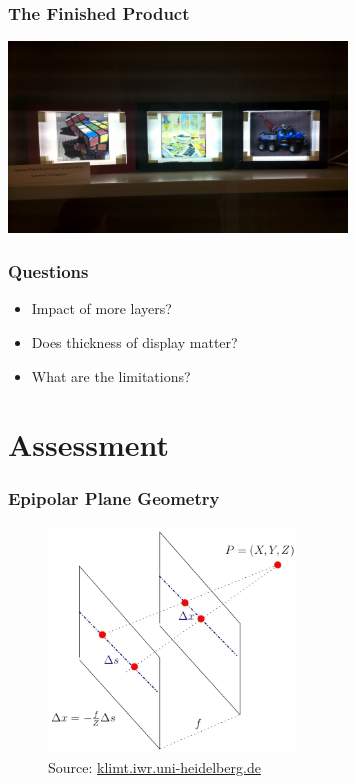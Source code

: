 \documentclass[12pt, compress]{beamer}
\begin{document}
\begin{frame}[fragile]
	\frametitle{The Finished Product}
	\begin{center}
		\includegraphics[width=9cm]{images/all_displays_on}
	\end{center}
\end{frame}

\begin{frame}[fragile]
	\frametitle{Questions}
	
	\begin{itemize}
		\item Impact of more layers?
		\item Does thickness of display matter?
		\item What are the limitations?
	\end{itemize}
\end{frame}

\section{Assessment}

\begin{frame}[fragile]
	\frametitle{Epipolar Plane Geometry}
	\begin{figure}
		\includegraphics[height = 6cm]{images/lf_geometry_modified.jpg}
		\caption*{Source: \href{http://klimt.iwr.uni-heidelberg.de/HCI/Research/LightField/images/lf_geometry.jpg}{klimt.iwr.uni-heidelberg.de}}
	\end{figure}
\end{frame}
\end{document}
